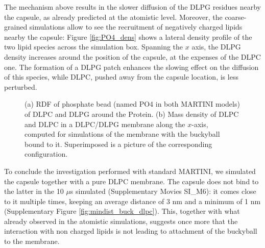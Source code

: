 The mechanism above results in the slower diffusion of the DLPG residues nearby the capsule, as already predicted at the atomistic level. Moreover, the coarse-grained simulations allow to see the recruitment of negatively charged lipids nearby the capsule: Figure \ref{fig:PO4_dens} shows a lateral density profile of the two lipid species across the simulation box. Spanning the $x$ axis, the DLPG density increases around the position of the capsule, at the expenses of the DLPC one. The formation of a DLPG patch enhances the slowing effect on the diffusion of this species, while DLPC, pushed away from the capsule location, is less perturbed.

\begin{figure}[t!]
\centering
{}
\caption[Proximity of lipids phosphate to bound capsule (MARTINI simulations)]{(a) RDF of phosphate bead (named PO4 in both MARTINI models) of DLPC and DLPG around the Protein. (b) Mass density of DLPC and DLPC in a DLPC/DLPG membrane along the $x$-axis, computed for simulations of the membrane with the buckyball bound to it. Superimposed is a picture of the corresponding configuration.}
\label{fig:PO4_RDF_dens}
\end{figure}

To conclude the investigation performed with standard MARTINI, we simulated the capsule together with a pure DLPC membrane. The capsule does not bind to the latter in the 10 $\mu$s simulated (Supplementary Movies SI\_M6): it comes close to it multiple times, keeping an average distance of 3 nm and a minimum of 1 nm (Supplementary Figure \ref{fig:mindist_buck_dlpc}). This, together with what already observed in the atomistic simulations, suggests once more that the interaction with non charged lipids is not leading to attachment of the buckyball to the membrane.

